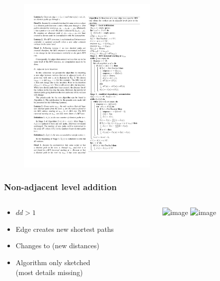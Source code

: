 \begin{frame}
\begin{figure}[t]
        \includegraphics[width=0.6\textwidth, height=0.6\textheight, keepaspectratio, valign=t]{imgs/green-algo2}
      \end{figure}
\end{frame}


\begin{frame}
  \frametitle{Non-adjacent level addition}

  \begin{columns}[onlytextwidth]

    \begin{column}{0.5\textwidth}
      \begin{itemize}
        \item $dd > 1$
        \item Edge creates new shortest paths
        \item Changes to \spdag (new distances)
        \item Algorithm only sketched \\ (most details missing)
      \end{itemize}
    \end{column}

    \begin{column}{0.5\textwidth}
      \begin{figure}[t]
        \centering
        \includegraphics<1>[width=\textwidth, height=0.8\textheight, keepaspectratio]{imgs/green-2lvl-before-compressed}
        \includegraphics<2>[width=\textwidth, height=0.8\textheight, keepaspectratio]{imgs/green-2lvl-after-compressed}
      \end{figure}
    \end{column}
  \end{columns}

\end{frame}


